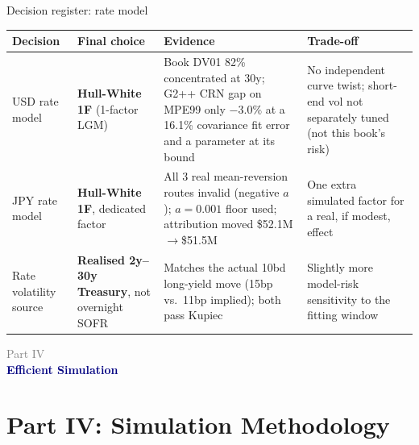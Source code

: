 \documentclass[8pt,aspectratio=169]{beamer}
\newcommand{\partframe}[2]{%
\begin{frame}
  \vspace{1.2cm}
  {\large\textcolor{grey}{Part #1}}\\[4pt]
  {\Large\textcolor{navy}{\textbf{#2}}}
\end{frame}}
\begin{document}
\begin{frame}{Decision register: rate model}
  \small
  \begin{tabular}{p{}p{}p{}p{}}
    \toprule
    \textbf{Decision} & \textbf{Final choice} & \textbf{Evidence} & \textbf{Trade-off} \\
    \midrule
    USD rate model & \textbf{Hull-White 1F} (1-factor LGM) & Book DV01 82\% concentrated at 30y; G2++ CRN gap on MPE99 only $-3.0\%$ at a 16.1\% covariance fit error and a parameter at its bound & No independent curve twist; short-end vol not separately tuned (not this book's risk) \\
    JPY rate model & \textbf{Hull-White 1F}, dedicated factor & All 3 real mean-reversion routes invalid (negative $a$); $a{=}0.001$ floor used; attribution moved \$52.1M$\to$\$51.5M & One extra simulated factor for a real, if modest, effect \\
    Rate volatility source & \textbf{Realised 2y--30y Treasury}, not overnight SOFR & Matches the actual 10bd long-yield move (15bp vs.\ 11bp implied); both pass Kupiec & Slightly more model-risk sensitivity to the fitting window \\
    \bottomrule
  \end{tabular}
\end{frame}

\partframe{IV}{Efficient Simulation}
\section{Part IV: Simulation Methodology}
\end{document}
